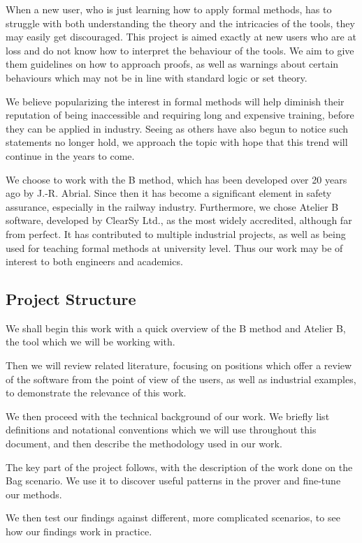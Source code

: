 \documentclass[12pt,journal,duplex]{IEEEtran}
\begin{document}
	When a new user, who is just learning how to apply formal methods, has to struggle with both understanding the theory and the intricacies of the tools, they may easily get discouraged. This project is aimed exactly at new users who are at loss and do not know how to interpret the behaviour of the tools. We aim to give them guidelines on how to approach proofs, as well as warnings about certain behaviours which may not be in line with standard logic or set theory.

	We believe popularizing the interest in formal methods will help diminish their reputation of being inaccessible and requiring long and expensive training, before they can be applied in industry. Seeing as others have also begun to notice such statements no longer hold\cite{amazon}, we approach the topic with hope that this trend will continue in the years to come.

	We choose to work with the B method, which has been developed over 20 years ago by J.-R. Abrial. Since then it has become a significant element in safety assurance, especially in the railway industry. Furthermore, we chose Atelier B software, developed by ClearSy Ltd., as the most widely accredited, although far from perfect. It has contributed to multiple industrial projects, as well as being used for teaching formal methods at university level. Thus our work may be of interest to both engineers and academics.

	\subsection{Project Structure}
	We shall begin this work with a quick overview of the B method and Atelier B, the tool which we will be working with.

	Then we will review related literature, focusing on positions which offer a review of the software from the point of view of the users, as well as industrial examples, to demonstrate the relevance of this work.

	We then proceed with the technical background of our work. We briefly list definitions and notational conventions which we will use throughout this document, and then describe the methodology used in our work.

	The key part of the project follows, with the description of the work done on the Bag scenario. We use it to discover useful patterns in the prover and fine-tune our methods.

	We then test our findings against different, more complicated scenarios, to see how our findings work in practice.
\end{document}
